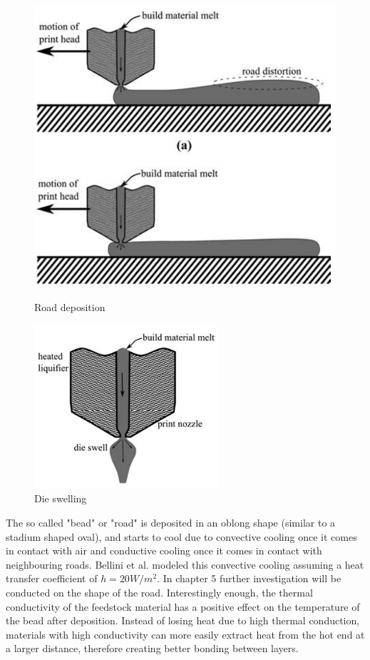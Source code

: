 \begin{figure}
\centering
\begin{minipage}{.5\textwidth}
  \centering
    \includegraphics[width=.6\textwidth]{chapter_2/figures/Extrusion.PNG}
   \caption{Road deposition \cite{Turner2014AModeling}}
    \label{fig:Roaddepostion}
\end{minipage}%
\begin{minipage}{.5\textwidth}
  \centering
  \includegraphics[width=.6\textwidth]{chapter_2/figures/dieswelling.PNG}
    \caption{Die swelling \cite{Turner2014AModeling}}
    \label{fig:dieswelling}
\end{minipage}
\end{figure}

The so called "bead" or "road" is deposited in an oblong shape (similar to a stadium shaped oval), and starts to cool due to convective cooling once it comes in contact with air and conductive cooling once it comes in contact with neighbouring roads. Bellini et al. \cite{Bellini2003MechanicalModeling} modeled this convective cooling assuming a heat transfer coefficient of $h =20 W/m^2$. In chapter 5 further investigation will be conducted on the shape of the road. Interestingly enough, the thermal conductivity of the feedstock material has a positive effect on the temperature of the bead after deposition. Instead of losing heat due to high thermal conduction, materials with high conductivity can more easily extract heat from the hot end at a larger distance, therefore creating better bonding between layers. 


